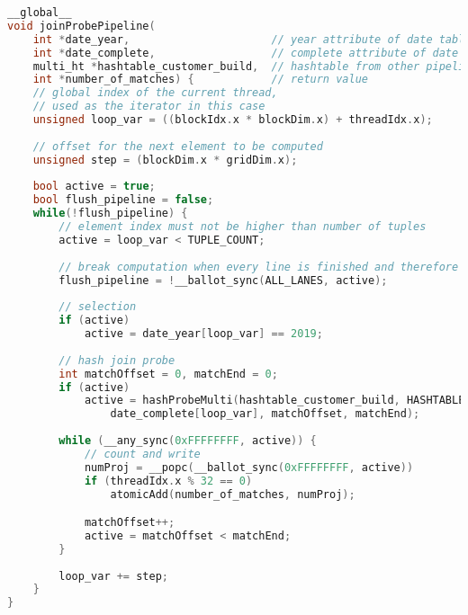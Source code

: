 \begin{lstlisting}[language=C++,
caption=Generierter Kernel für den Beispielplan,
label=pipelining_example_code,
linebackgroundcolor={%
\ifnum\value{lstnumber}>22
	\ifnum\value{lstnumber}<26
		\color{red!25}
	\fi
\fi
\ifnum\value{lstnumber}>26
	\ifnum\value{lstnumber}<34
		\color{green!25}
	\fi
\fi
\ifnum\value{lstnumber}>33
	\ifnum\value{lstnumber}<38
		\color{yellow!25}
	\fi
\fi
\ifnum\value{lstnumber}>37
	\ifnum\value{lstnumber}<42
		\color{green!25}
	\fi
\fi
}]
__global__
void joinProbePipeline(
	int *date_year,                      // year attribute of date table
	int *date_complete,                  // complete attribute of date table
	multi_ht *hashtable_customer_build,  // hashtable from other pipeline
	int *number_of_matches) {            // return value
	// global index of the current thread,
	// used as the iterator in this case
	unsigned loop_var = ((blockIdx.x * blockDim.x) + threadIdx.x);
	
	// offset for the next element to be computed
	unsigned step = (blockDim.x * gridDim.x);
	
	bool active = true;
	bool flush_pipeline = false;
	while(!flush_pipeline) {
		// element index must not be higher than number of tuples
		active = loop_var < TUPLE_COUNT;
		
		// break computation when every line is finished and therefore inactive
		flush_pipeline = !__ballot_sync(ALL_LANES, active);
		
		// selection
		if (active)
			active = date_year[loop_var] == 2019;
		
		// hash join probe
		int matchOffset = 0, matchEnd = 0;
		if (active)
			active = hashProbeMulti(hashtable_customer_build, HASHTABLE_SIZE,
				date_complete[loop_var], matchOffset, matchEnd);
		
		while (__any_sync(0xFFFFFFFF, active)) {
			// count and write
			numProj = __popc(__ballot_sync(0xFFFFFFFF, active))
			if (threadIdx.x % 32 == 0)
				atomicAdd(number_of_matches, numProj);

			matchOffset++;
			active = matchOffset < matchEnd;
		}
		
		loop_var += step;
	}
}
\end{lstlisting}
